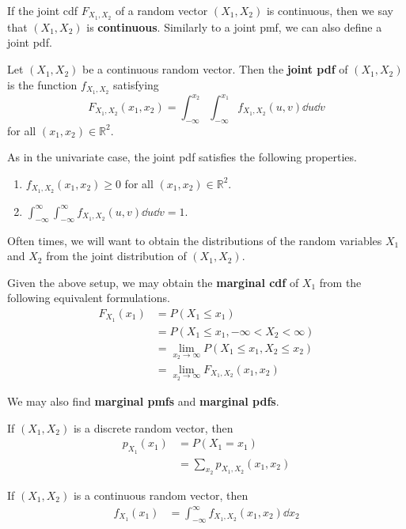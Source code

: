 If the joint cdf $F_{X_1,X_2}$ of a random vector $(X_1,X_2)$ is continuous, then we say that $(X_1,X_2)$ is \textbf{continuous}. Similarly to a joint pmf, we can also define a joint pdf.

\begin{definition}
	Let $(X_1,X_2)$ be a continuous random vector. Then the \textbf{joint pdf} of $(X_1,X_2)$ is the function $f_{X_1,X_2}$ satisfying
	$$F_{X_1,X_2}(x_1,x_2)=\int_{-\infty}^{x_2}\int_{-\infty}^{x_1}f_{X_1,X_2}(u,v)\dd u\dd v$$
	for all $(x_1,x_2)\in\mathbb R^2$.
\end{definition}

As in the univariate case, the joint pdf satisfies the following properties.
\begin{enumerate}
	\item $f_{X_1,X_2}(x_1,x_2)\geq 0$ for all $(x_1,x_2)\in\mathbb R^2$.
	\item $\int_{-\infty}^{\infty}\int_{-\infty}^{\infty}f_{X_1,X_2}(u,v)\dd u\dd v=1$.
\end{enumerate}

Often times, we will want to obtain the distributions of the random variables $X_1$ and $X_2$ from the joint distribution of $(X_1,X_2)$.

Given the above setup, we may obtain the \textbf{marginal cdf} of $X_1$ from the following equivalent formulations.
\begin{align*}
	F_{X_1}(x_1)&=P(X_1\leq x_1)\\
	&=P(X_1\leq x_1,-\infty<X_2<\infty)\\
	&=\lim_{x_2\to\infty}P(X_1\leq x_1,X_2\leq x_2)\\
	&=\lim_{x_2\to\infty} F_{X_1,X_2}(x_1,x_2)
\end{align*}

We may also find \textbf{marginal pmfs} and \textbf{marginal pdfs}.

If $(X_1,X_2)$ is a discrete random vector, then
\begin{align*}
	p_{X_1}(x_1)&=P(X_1=x_1)\\
	&=\sum_{x_2}p_{X_1,X_2}(x_1,x_2)
\end{align*}

If $(X_1,X_2)$ is a continuous random vector, then
\begin{align*}
	f_{X_1}(x_1)&=\int_{-\infty}^{\infty}f_{X_1,X_2}(x_1,x_2)\dd{x_2}\\
\end{align*}

